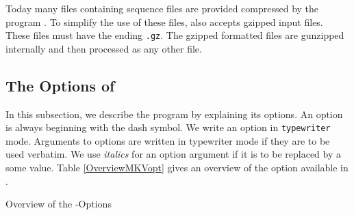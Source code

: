 \documentclass[12pt,titlepage]{article}
\begin{document}
Today many files containing sequence files are provided compressed
by the program . To simplify the use of these files,
\MKV also accepts gzipped input files. These files must have the ending 
\texttt{.gz}. The gzipped formatted files are
gunzipped internally and then processed as any other file.
\label{Gzipinputformat}

\subsection{The Options of \MKV}

In this subsection, we describe the program \MKV by explaining its options. 
An option is always beginning with the dash symbol. 
We write an option in \texttt{typewriter} mode. Arguments to options
are written in typewriter mode if they are to be used verbatim.
We use \textit{italics} for an option argument if it is to be replaced by a 
some value. Table \ref{OverviewMKVopt} gives an overview of the
option available in \MKV. 

\begin{table}
\caption{Overview of the \MKV-Options}
\label{OverviewMKVopt}
\begin{footnotesize}
\begin{center}

\end{center}
\end{footnotesize}
\end{table}
\end{document}
